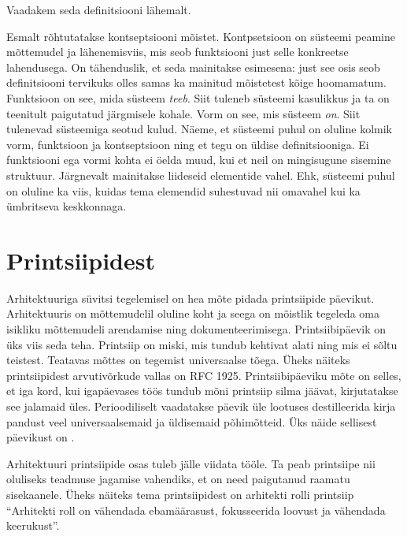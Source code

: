\documentclass{tufte-book}
\begin{document}
Vaadakem seda definitsiooni lähemalt. 

Esmalt rõhtutatakse kontseptsiooni mõistet. Kontpsetsioon on süsteemi peamine mõttemudel ja lähenemisviis, mis seob funktsiooni just selle konkreetse lahendusega. On tähenduslik, et seda mainitakse esimesena: just see osis seob definitsiooni tervikuks olles samas ka mainitud mõistetest kõige hoomamatum. Funktsioon on see, mida süsteem \emph{teeb}. Siit tuleneb süsteemi kasulikkus ja ta on teenitult paigutatud järgmisele kohale. Vorm on see, mis süsteem \emph{on}. Siit tulenevad süsteemiga seotud kulud. Näeme, et süsteemi puhul on oluline kolmik vorm, funktsioon ja kontseptsioon ning et tegu on üldise definitsiooniga. Ei funktsiooni ega vormi kohta ei öelda muud, kui et neil on mingisugune sisemine struktuur. Järgnevalt mainitakse liideseid elementide vahel. Ehk, süsteemi puhul on oluline ka viis, kuidas tema elemendid suhestuvad nii omavahel kui ka ümbritseva keskkonnaga.

\section{Printsiipidest}
Arhitektuuriga süvitsi tegelemisel on hea mõte pidada printsiipide päevikut. Arhitektuuris on mõttemudelil oluline koht ja seega on mõistlik tegeleda oma isikliku mõttemudeli arendamise ning dokumenteerimisega. Printsiibipäevik on üks viis seda teha. Printsiip on miski, mis tundub kehtivat alati ning mis ei sõltu teistest. Teatavas mõttes on tegemist universaalse tõega. Üheks näiteks printsiipidest arvutivõrkude vallas on RFC 1925\cite{callon1996rfc}. Printsiibipäeviku mõte on selles, et iga kord, kui igapäevases töös tundub mõni printsiip silma jäävat, kirjutatakse see jalamaid üles. Perioodiliselt vaadatakse päevik üle lootuses destilleerida kirja pandust veel universaalsemaid ja üldisemaid põhimõtteid. Üks näide sellisest päevikust on \cite{archprinciples}. 

Arhitektuuri printsiipide osas tuleb jälle viidata \citeauthor{crawley2015systems} tööle. Ta peab printsiipe nii oluliseks teadmuse jagamise vahendiks, et on need paigutanud raamatu sisekaanele. Üheks näiteks tema printsiipidest on arhitekti rolli printsiip \enquote{Arhitekti roll on vähendada ebamäärasust, fokusseerida loovust ja vähendada keerukust}\cite{crawley2015systems}.
\end{document}
